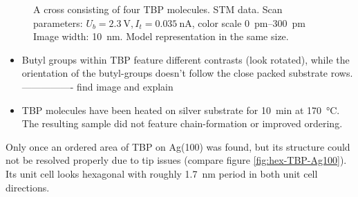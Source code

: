 \begin{figure}[] \centering
{}
\caption{A cross consisting of four TBP molecules.  STM data. Scan parameters: $U_b=\SI{2.3}{\volt}, I_t=\SI{0,035}{\nano \ampere}$, color scale \SIrange{0}{300}{\pico\meter} Image width: \SI{10}{\nm}.  Model representation in the same size.}
\label{fig:single-TBP-Ag100-cross}
\end{figure}

\begin{itemize}
 \item Butyl groups within TBP feature different contrasts (look rotated), while the orientation of the butyl-groups doesn't follow the close packed substrate rows. ---------------- find image and explain
 \item TBP molecules have been heated on silver substrate for \SI{10}{\minute} at \SI{170}{\celsius}. The resulting sample did not feature chain-formation or improved ordering.
\end{itemize}

Only once an ordered area of TBP on Ag(100) was found, but its structure could not be resolved properly due to tip issues (compare figure \ref{fig:hex-TBP-Ag100}). Its unit cell looks hexagonal with roughly \SI{1.7} {\nano \meter} period in both unit cell directions. 

